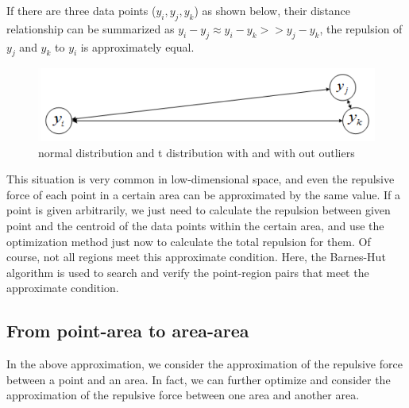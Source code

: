 \noindent If there are three data points ($y_i,y_j,y_k$) as shown below, their distance relationship can be summarized as $y_i−y_j ≈ y_i−y_k >> y_j−y_k$, the repulsion of $y_j$ and $y_k$ to $y_i$ is approximately equal.

\begin{figure}[ht]

\centering
\includegraphics[scale=0.6]{images/image_point_region_1.PNG}
\caption{normal distribution and t distribution with and with out outliers}
\label{fig:label}
\end{figure}

\noindent This situation is very common in low-dimensional space, and even the repulsive force of each point in a certain area can be approximated by the same value. If a point is given arbitrarily, we just need to calculate the repulsion between given point and the centroid of the data points within the certain area, and use the optimization method just now to calculate the total repulsion for them. Of course, not all regions meet this approximate condition. Here, the Barnes-Hut algorithm is used to search and verify the point-region pairs that meet the approximate condition.\\

\subsection{From point-area to area-area}

\noindent In the above approximation, we consider the approximation of the repulsive force between a point and an area. In fact, we can further optimize and consider the approximation of the repulsive force between one area and another area.
\\

